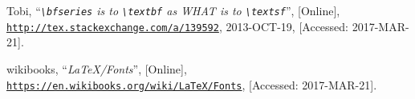 \documentclass[a4paper,oneside,11pt]{article}
\newcommand\comm[1]{\texttt{\textbackslash#1}}
\begin{document}
\begin{thebibliography}{1}
        Tobi,
        ``\emph{\comm{bfseries} is to \comm{textbf} as WHAT is to \comm{textsf}}'',
        [Online],
        \href{http://tex.stackexchange.com/a/139592}
             {\nolinkurl{http://tex.stackexchange.com/a/139592}},
        2013-OCT-19,
        [Accessed: 2017-MAR-21].

        wikibooks,
        ``\emph{\LaTeX/Fonts}'',
        [Online],
        \href{https://en.wikibooks.org/wiki/LaTeX/Fonts}
             {\nolinkurl{https://en.wikibooks.org/wiki/LaTeX/Fonts}},
        [Accessed: 2017-MAR-21].

\end{thebibliography}
\end{document}
